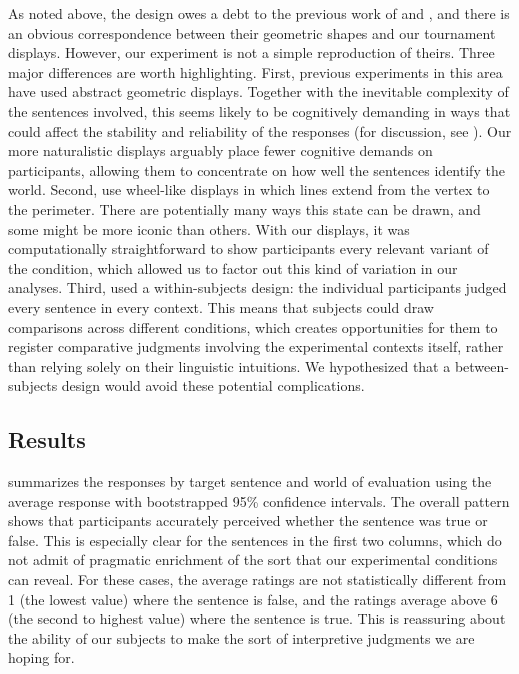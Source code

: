 \documentclass[leqno]{article}
\begin{document}
As noted above, the design owes a debt to the previous work of
\citet{Geurts:Pouscoulous:2009} and \citet{Chemla:Spector:2011}, and
there is an obvious correspondence between their geometric shapes and
our tournament displays. However, our experiment is not a simple
reproduction of theirs. Three major differences are worth
highlighting. First, previous experiments in this area have used
abstract geometric displays. Together with the inevitable complexity
of the sentences involved, this seems likely to be cognitively
demanding in ways that could affect the stability and reliability of
the responses (for discussion, see \citealt{Clifton:Dube:2010}). Our
more naturalistic displays arguably place fewer cognitive demands on
participants, allowing them to concentrate on how well the sentences
identify the world. Second, \citeauthor{Chemla:Spector:2011} use
wheel-like displays in which lines extend from the vertex to the
perimeter. There are potentially many ways this state can be drawn,
and some might be more iconic than others. With our displays, it was
computationally straightforward to show participants every relevant
variant of the condition, which allowed us to factor out this kind of
variation in our analyses. Third, \citeauthor{Chemla:Spector:2011}
used a within-subjects design: the individual participants judged
every sentence in every context. This means that subjects could draw
comparisons across different conditions, which creates opportunities
for them to register comparative judgments involving the experimental
contexts itself, rather than relying solely on their linguistic
intuitions. We hypothesized that a between-subjects design would avoid
these potential complications.


\subsection{Results}\label{sec:exp1:results}

 summarizes the responses by target sentence
and world of evaluation using the average response with bootstrapped
95\% confidence intervals. The overall pattern shows that participants
accurately perceived whether the sentence was true or false. This is
especially clear for the sentences in the first two columns, which do
not admit of pragmatic enrichment of the sort that our experimental
conditions can reveal. For these cases, the average ratings are not
statistically different from 1 (the lowest value) where the sentence
is false, and the ratings average above 6 (the second to highest
value) where the sentence is true. This is reassuring about the
ability of our subjects to make the sort of interpretive judgments we
are hoping for.
\end{document}
